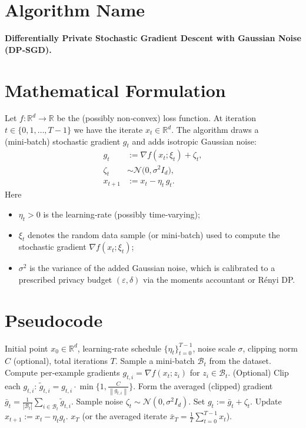 \documentclass{article}
\newcommand{\norm}[1]{\left\|#1\right\|}
\newcommand{\grad}{\nabla}
\begin{document}
\section*{Algorithm Name}
\textbf{Differentially Private Stochastic Gradient Descent with Gaussian Noise (DP‑SGD).}

\section*{Mathematical Formulation}
Let $f:\mathbb{R}^{d}\rightarrow\mathbb{R}$ be the (possibly non‑convex) loss function.  
At iteration $t\in\{0,1,\dots,T-1\}$ we have the iterate $x_t\in\mathbb{R}^{d}$.
The algorithm draws a (mini‑batch) stochastic gradient $g_t$ and adds isotropic
Gaussian noise:
\[
\boxed{
\begin{aligned}
g_t &:= \grad f(x_t;\xi_t) + \zeta_t,\\[0.2em]
\zeta_t &\sim \mathcal{N}\!\bigl(0,\sigma^{2} I_d\bigr),\\[0.2em]
x_{t+1} &:= x_t - \eta_t\, g_t .
\end{aligned}}
\]
Here
\begin{itemize}
    \item $\eta_t>0$ is the learning‑rate (possibly time‑varying);
    \item $\xi_t$ denotes the random data sample (or mini‑batch) used to compute the
          stochastic gradient $\grad f(x_t;\xi_t)$;
    \item $\sigma^{2}$ is the variance of the added Gaussian noise, which is
          calibrated to a prescribed privacy budget $(\varepsilon,\delta)$ via the
          moments accountant or R\'enyi DP.
\end{itemize}

\section*{Pseudocode}
\begin{algorithm}[H]
\caption{DP‑SGD}
\begin{algorithmic}[1]
\REQUIRE Initial point $x_0\in\mathbb{R}^{d}$, learning‑rate schedule $\{\eta_t\}_{t=0}^{T-1}$,
         noise scale $\sigma$, clipping norm $C$ (optional), total iterations $T$.
    \STATE Sample a mini‑batch $\mathcal{B}_t$ from the dataset.
    \STATE Compute per‑example gradients $g_{t,i}= \grad f(x_t;z_i)$ for $z_i\in\mathcal{B}_t$.
    \STATE (Optional) Clip each $g_{t,i}$: $ \tilde g_{t,i}= g_{t,i}\cdot\min\!\bigl\{1,\frac{C}{\norm{g_{t,i}}}\bigr\}$.
    \STATE Form the averaged (clipped) gradient $\bar g_t=\frac{1}{|\mathcal{B}_t|}\sum_{i\in\mathcal{B}_t}\tilde g_{t,i}$.
    \STATE Sample noise $\zeta_t\sim\mathcal{N}(0,\sigma^{2}I_d)$.
    \STATE Set $g_t:=\bar g_t+\zeta_t$.
    \STATE Update $x_{t+1}:=x_t-\eta_t g_t$.
\ENDFOR
\RETURN $x_T$ (or the averaged iterate $\bar x_T=\frac{1}{T}\sum_{t=0}^{T-1}x_t$).
\end{algorithmic}
\end{algorithm}
\end{document}
